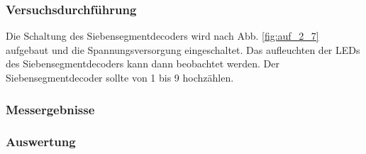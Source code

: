 \documentclass[12pt,a4paper]{article}
\begin{document}
\subsubsection*{Versuchsdurchführung}
Die Schaltung des Siebensegmentdecoders wird nach Abb. \ref{fig:auf_2_7} aufgebaut und die Spannungsversorgung eingeschaltet. Das aufleuchten der LEDs des Siebensegmentdecoders kann dann beobachtet werden. Der Siebensegmentdecoder sollte von 1 bis 9 hochzählen.
\subsubsection*{Messergebnisse}
\subsubsection*{Auswertung}
\end{document}

